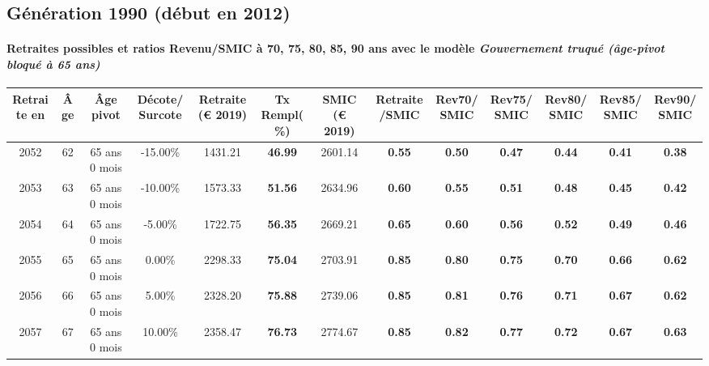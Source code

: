 \newpage 
 
\subsection{Génération 1990 (début en 2012)} 

\paragraph{Retraites possibles et ratios Revenu/SMIC à 70, 75, 80, 85, 90 ans avec le modèle \emph{Gouvernement truqué (âge-pivot bloqué à 65 ans)}}  
 
{ \scriptsize \begin{center} 
\begin{tabular}[htb]{|c|c||c|c||c|c||c||c|c|c|c|c|c|} 
\hline 
 Retraite en &  Âge &  Âge pivot &  Décote/Surcote &  Retraite (\euro{} 2019) &  Tx Rempl(\%) &  SMIC (\euro{} 2019) &  Retraite/SMIC &  Rev70/SMIC &  Rev75/SMIC &  Rev80/SMIC &  Rev85/SMIC &  Rev90/SMIC \\ 
\hline \hline 
 2052 &  62 &  65 ans 0 mois &  -15.00\% &  1431.21 &  {\bf 46.99} &  2601.14 &  {\bf {\color{red} 0.55}} &  {\bf {\color{red} 0.50}} &  {\bf {\color{red} 0.47}} &  {\bf {\color{red} 0.44}} &  {\bf {\color{red} 0.41}} &  {\bf {\color{red} 0.38}} \\ 
\hline 
 2053 &  63 &  65 ans 0 mois &  -10.00\% &  1573.33 &  {\bf 51.56} &  2634.96 &  {\bf {\color{red} 0.60}} &  {\bf {\color{red} 0.55}} &  {\bf {\color{red} 0.51}} &  {\bf {\color{red} 0.48}} &  {\bf {\color{red} 0.45}} &  {\bf {\color{red} 0.42}} \\ 
\hline 
 2054 &  64 &  65 ans 0 mois &  -5.00\% &  1722.75 &  {\bf 56.35} &  2669.21 &  {\bf {\color{red} 0.65}} &  {\bf {\color{red} 0.60}} &  {\bf {\color{red} 0.56}} &  {\bf {\color{red} 0.52}} &  {\bf {\color{red} 0.49}} &  {\bf {\color{red} 0.46}} \\ 
\hline 
 2055 &  65 &  65 ans 0 mois &  0.00\% &  2298.33 &  {\bf 75.04} &  2703.91 &  {\bf {\color{red} 0.85}} &  {\bf {\color{red} 0.80}} &  {\bf {\color{red} 0.75}} &  {\bf {\color{red} 0.70}} &  {\bf {\color{red} 0.66}} &  {\bf {\color{red} 0.62}} \\ 
\hline 
 2056 &  66 &  65 ans 0 mois &  5.00\% &  2328.20 &  {\bf 75.88} &  2739.06 &  {\bf {\color{red} 0.85}} &  {\bf {\color{red} 0.81}} &  {\bf {\color{red} 0.76}} &  {\bf {\color{red} 0.71}} &  {\bf {\color{red} 0.67}} &  {\bf {\color{red} 0.62}} \\ 
\hline 
 2057 &  67 &  65 ans 0 mois &  10.00\% &  2358.47 &  {\bf 76.73} &  2774.67 &  {\bf {\color{red} 0.85}} &  {\bf {\color{red} 0.82}} &  {\bf {\color{red} 0.77}} &  {\bf {\color{red} 0.72}} &  {\bf {\color{red} 0.67}} &  {\bf {\color{red} 0.63}} \\ 
\hline 
\hline 
\end{tabular} 
\end{center} } 
